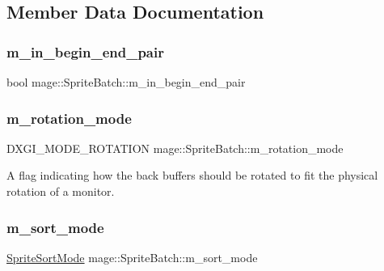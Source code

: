 \subsection{Member Data Documentation}
\hypertarget{classmage_1_1_sprite_batch_a2f4e56ee07ef37a2906c552b0ea78403}{}\label{classmage_1_1_sprite_batch_a2f4e56ee07ef37a2906c552b0ea78403} 
\subsubsection{\texorpdfstring{m\+\_\+in\+\_\+begin\+\_\+end\+\_\+pair}{m\_in\_begin\_end\_pair}}
{\footnotesize\ttfamily bool mage\+::\+Sprite\+Batch\+::m\+\_\+in\+\_\+begin\+\_\+end\+\_\+pair\hspace{0.3cm}{\ttfamily [private]}}

\hypertarget{classmage_1_1_sprite_batch_ae062f178efe4a3af9c1573f8f8c4deee}{}\label{classmage_1_1_sprite_batch_ae062f178efe4a3af9c1573f8f8c4deee} 
\subsubsection{\texorpdfstring{m\+\_\+rotation\+\_\+mode}{m\_rotation\_mode}}
{\footnotesize\ttfamily D\+X\+G\+I\+\_\+\+M\+O\+D\+E\+\_\+\+R\+O\+T\+A\+T\+I\+ON mage\+::\+Sprite\+Batch\+::m\+\_\+rotation\+\_\+mode\hspace{0.3cm}{\ttfamily [private]}}

A flag indicating how the back buffers should be rotated to fit the physical rotation of a monitor. \hypertarget{classmage_1_1_sprite_batch_a0b2b16b0d9eb63501b6fc0f9ce85e022}{}\label{classmage_1_1_sprite_batch_a0b2b16b0d9eb63501b6fc0f9ce85e022} 
\subsubsection{\texorpdfstring{m\+\_\+sort\+\_\+mode}{m\_sort\_mode}}
{\footnotesize\ttfamily \hyperlink{namespacemage_a256fa5833eecc408923de7ffadb5e014}{Sprite\+Sort\+Mode} mage\+::\+Sprite\+Batch\+::m\+\_\+sort\+\_\+mode\hspace{0.3cm}{\ttfamily [private]}}


